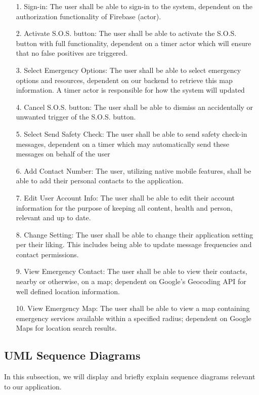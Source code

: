 \documentclass[10pt, a4paper]{article}
\begin{document}
\begin{enumerate}
	\item[1.] Sign-in: The user shall be able to sign-in to the system, dependent on the authorization functionality of Firebase (actor).
	\item[2.] Activate S.O.S. button: The user shall be able to activate the S.O.S. button with full functionality, dependent on a timer actor which will ensure that no false positives are triggered.
	\item[3.] Select Emergency Options: The user shall be able to select emergency options and resources, dependent on our backend to retrieve this map information. A timer actor is responsible for how the system will updated 
	\item[4.] Cancel S.O.S. button: The user shall be able to dismiss an accidentally or unwanted trigger of the S.O.S. button.
	\item[5.] Select Send Safety Check: The user shall be able to send safety check-in messages, dependent on a timer which may automatically send these messages on behalf of the user
	\item[6.] Add Contact Number: The user, utilizing native mobile features, shall be able to add their personal contacts to the application.
	\item[7.] Edit User Account Info: The user shall be able to edit their account information for the purpose of keeping all content, health and person, relevant and up to date.
	\item[8.] Change Setting: The user shall be able to change their application setting per their liking. This includes being able to update message frequencies and contact permissions.
	\item[9.] View Emergency Contact: The user shall be able to view their contacts, nearby or otherwise, on a map; dependent on Google's Geocoding API for well defined location information.
	\item[10.] View Emergency Map: The user shall be able to view a map containing emergency services available within a specified radius; dependent on Google Maps for location search results. 
\end{enumerate}

\subsection{UML Sequence Diagrams}
In this subsection, we will display and briefly explain sequence diagrams relevant to our application.
\end{document}
